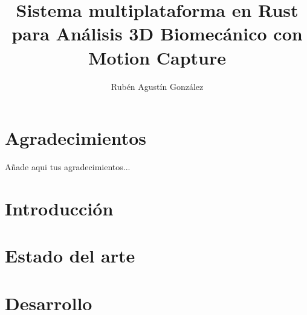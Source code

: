 
\newcommand{\pfg}{Proyecto Fin de Grado }

\title{Sistema multiplataforma en Rust para Análisis 3D 
Biomecánico con Motion Capture}
\author{Rubén Agustín González}



\hypersetup{pageanchor=false}
\begin{titlepage}
    \thispagestyle{empty}
    
\end{titlepage}

\newpage
\begin{abstract}
    
\end{abstract}
\renewcommand{\abstractname}{Abstract} %
\newpage
\vspace{10cm}
\begin{abstract}
    
\end{abstract}

\chapter*{Agradecimientos}
\noindent Añade aqui tus agradecimientos...

\listoffigures


\hypersetup{pageanchor=false}
\hypersetup{linkcolor=black}
\tableofcontents


\chapter{Introducción}
\label{sec:cap1}


\chapter{Estado del arte}
\label{sec:cap2}


\chapter{Desarrollo}
\label{sec:cap3}


